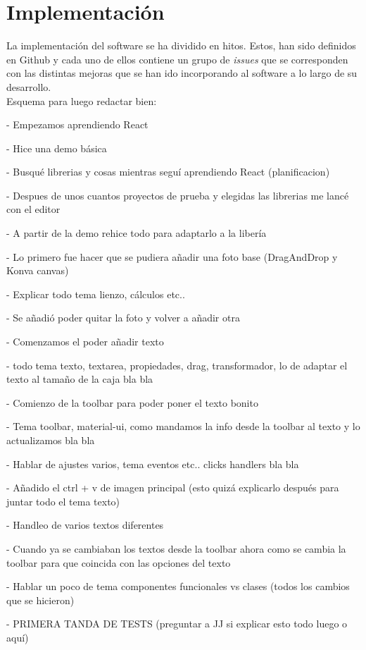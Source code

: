 \chapter{Implementación}

\iffalse
La implementación del software se ha dividido en hitos. Estos, han sido definidos en Github
y cada uno de ellos contiene un grupo de \textit{issues} que se corresponden con las distintas
mejoras que se han ido incorporando al software a lo largo de su desarrollo.\\

Esquema para luego redactar bien:

- Empezamos aprendiendo React

- Hice una demo básica

- Busqué librerias y cosas mientras seguí aprendiendo React (planificacion)

- Despues de unos cuantos proyectos de prueba y elegidas las librerias me lancé con el editor

- A partir de la demo rehice todo para adaptarlo a la libería 

- Lo primero fue hacer que se pudiera añadir una foto base (DragAndDrop y Konva canvas)

- Explicar todo tema lienzo, cálculos etc..

- Se añadió poder quitar la foto y volver a añadir otra

- Comenzamos el poder añadir texto

- todo tema texto, textarea, propiedades, drag, transformador, lo de adaptar el texto al tamaño de la caja bla bla 

- Comienzo de la toolbar para poder poner el texto bonito

- Tema toolbar, material-ui, como mandamos la info desde la toolbar al texto y lo actualizamos bla bla

- Hablar de ajustes varios, tema eventos etc.. clicks handlers bla bla

- Añadido el ctrl + v de imagen principal (esto quizá explicarlo después para juntar todo el tema texto)

- Handleo de varios textos diferentes

- Cuando ya se cambiaban los textos desde la toolbar ahora como se cambia la toolbar para que coincida con las opciones del texto

- Hablar un poco de tema componentes funcionales vs clases (todos los cambios que se hicieron)

- PRIMERA TANDA DE TESTS (preguntar a JJ si explicar esto todo luego o aquí)

